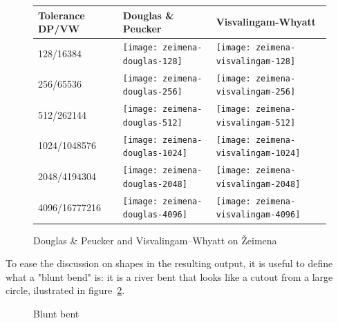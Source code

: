 \documentclass[a4paper]{article}
\newcommand{\DP}{Douglas \& Peucker}
\newcommand{\VW}{Visvalingam--Whyatt}
\begin{document}
\begin{figure}[H]
    \renewcommand{\tabularxcolumn}[1]{>{\center\small}m{#1}}
    \begin{tabularx}{\textwidth}{ p{2.1cm} | X | X | }
        Tolerance DP/VW                                                   &
        Douglas \& Peucker                                                &
        Visvalingam-Whyatt                                                \tabularnewline \hline

        128/16384                                                         &
        \texttt{[image: zeimena-douglas-128]}           &
        \texttt{[image: zeimena-visvalingam-128]}       \tabularnewline \hline

        256/65536                                                         &
        \texttt{[image: zeimena-douglas-256]}         &
        \texttt{[image: zeimena-visvalingam-256]}     \tabularnewline \hline

        512/262144                                                        &
        \texttt{[image: zeimena-douglas-512]}        &
        \texttt{[image: zeimena-visvalingam-512]}    \tabularnewline \hline

        1024/1048576                                                      &
        \texttt{[image: zeimena-douglas-1024]}      &
        \texttt{[image: zeimena-visvalingam-1024]}  \tabularnewline \hline

        2048/4194304                                                      &
        \texttt{[image: zeimena-douglas-2048]}     &
        \texttt{[image: zeimena-visvalingam-2048]} \tabularnewline \hline

        4096/16777216                                                     &
        \texttt{[image: zeimena-douglas-4096]}     &
        \texttt{[image: zeimena-visvalingam-4096]} \tabularnewline \hline
    \end{tabularx}
    \caption{{\DP} and {\VW} on Žeimena}
    \label{tab:comparison-zeimena}
\end{figure}

To ease the discussion on shapes in the resulting output, it is useful to
define what a "blunt bend" is: it is a river bent that looks like a cutout from
a large circle, ilustrated in figure~\ref{fig:blunt-bent}.

\begin{figure}[h]
    \centering
    \caption{Blunt bent}
    \label{fig:blunt-bent}
\end{figure}
\end{document}
